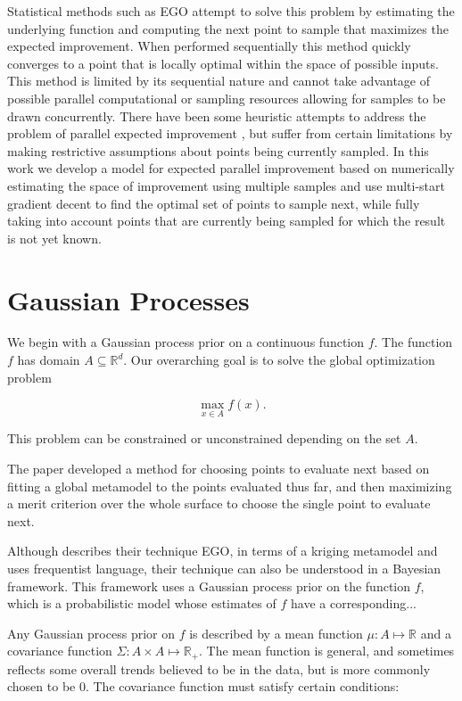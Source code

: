 \documentclass[phd,tocprelim]{cornell}
\begin{document}
Statistical methods such as EGO \cite{EGO} attempt to solve this problem by estimating the underlying function and computing the next point to sample that maximizes the expected improvement. When performed sequentially this method quickly converges to a point that is locally optimal within the space of possible inputs. This method is limited by its sequential nature and cannot take advantage of possible parallel computational or sampling resources allowing for samples to be drawn concurrently. There have been some heuristic attempts to address the problem of parallel expected improvement \cite{Ginsbourger2008}, but suffer from certain limitations by making restrictive assumptions about points being currently sampled. In this work we develop a model for expected parallel improvement based on numerically estimating the space of improvement using multiple samples and use multi-start gradient decent to find the optimal set of points to sample next, while fully taking into account points that are currently being sampled for which the result is not yet known.

\section{Gaussian Processes}

We begin with a Gaussian process prior on a continuous function $f$. The function $f$ has domain $A \subseteq \mathbb{R}^{d}$. Our overarching goal is to solve the global optimization problem

\begin{equation}
\max_{x \in A} f(x).
\end{equation}

This problem can be constrained or unconstrained depending on the set $A$.

The paper \cite{JoScWe98} developed a method for choosing points to evaluate next based on fitting a global metamodel to the points evaluated thus far, and then maximizing a merit criterion over the whole surface to choose the single point to evaluate next.

Although \cite{JoScWe98} describes their technique EGO, in terms of a kriging metamodel and uses frequentist language, their technique can also be understood in a Bayesian framework. This framework uses a Gaussian process prior on the function $f$, which is a probabilistic model whose estimates of $f$ have a corresponding...

Any Gaussian process prior on $f$ is described by a mean function $\mu : A \mapsto \mathbb{R}$ and a covariance function $\Sigma : A \times A \mapsto \mathbb{R}_{+}$. The mean function is general, and sometimes reflects some overall trends believed to be in the data, but is more commonly chosen to be 0. The covariance function must satisfy certain conditions: 
\end{document}
